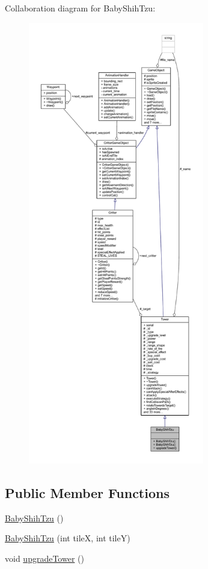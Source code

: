 Collaboration diagram for Baby\+Shih\+Tzu\+:
\nopagebreak
\begin{figure}[H]
\begin{center}
\leavevmode
\includegraphics[height=550pt]{class_baby_shih_tzu__coll__graph}
\end{center}
\end{figure}
\subsection*{Public Member Functions}
\begin{DoxyCompactItemize}
\item 
\hyperlink{class_baby_shih_tzu_acc87c55b63e1aa025cb277c436570b6a}{Baby\+Shih\+Tzu} ()
\item 
\hyperlink{class_baby_shih_tzu_afcc1a988bb58e1e4f1eeab886c7c233d}{Baby\+Shih\+Tzu} (int tile\+X, int tile\+Y)
\item 
void \hyperlink{class_baby_shih_tzu_a7f399d78e0420acde53fac63316bd70f}{upgrade\+Tower} ()
\end{DoxyCompactItemize}
